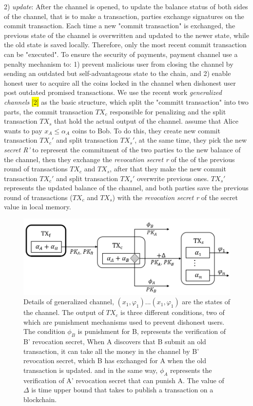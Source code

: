 \documentclass[conference]{IEEEtran}
\begin{document}
2) \emph{update}: After the channel is opened, to update the balance status of both sides of the channel, that is to make a transaction, 
parties exchange signatures on the commit transaction. Each time a new "commit transaction" is exchanged, the previous state of the channel 
is overwritten and updated to the newer state, while the old state is saved locally. Therefore, only the most recent commit transaction 
can be "executed". To ensure the security of payments, payment channel use a penalty mechanism to: 1) prevent malicious user from closing 
the channel by sending an outdated but self-advantageous state to the chain, and 2) enable honest user to acquire all the coins locked in the 
channel when dishonest user post outdated promised transactions. We use the recent work \emph{generalized channels} \colorbox{yellow}{[2]} 
as the basic structure, which split the "committ transaction" into two parts, the commit transaction $TX_c$ responsible for penalizing and 
the split transaction $TX_s$ that hold the actual output of the channel. assume that Alice wants to pay $x_A \leq \alpha_A$ coins to Bob. 
To do this, they create new commit transaction $TX_c'$ and split transaction $TX_s'$, at the same time, they pick the new \emph{secret R'} 
to represent the commitment of the two parties to the new balance of the channel, then they exchange the \emph{revocation secret r} of the 
of the previous round of transactions $TX_c$ and $TX_s$, after that they make the new commit transaction $TX_c'$ and split transaction $TX_s'$ 
overwrite previous ones. $TX_s'$ represents the updated balance of the channel, and both parties save the previous 
round of transactions ($TX_c$ and $TX_s$) with the \emph{revocation secret r} of the secret value in local memory.


\begin{figure}[t]
    \centering
    \includegraphics[scale=0.45]{fig3.png}
    \caption{Details of generalized channel, $(x_1,\varphi_1)...(x_1,\varphi_1)$ are the states of the channel. The output of $TX_c$ 
    is three different conditions, two of which are punishment mechanisms used to prevent dishonest users. The condition $\phi_B$ is
    punishment for B, represents the verification of B’ revocation secret, When A discovers that B submit an old transaction, it can 
    take all the money in the channel by B' revocation secret, which B has exchanged for A when the old transaction is updated.
    and in the same way, $\phi_A$ represents the verification of A’ revocation secret that can punish A. The value of $\Delta$ is time upper 
    bound that takes to publish a transaction on a blockchain.
     }
\end{figure}
\end{document}
